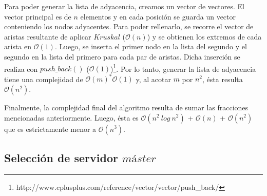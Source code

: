 \begin{itemize}
\begin{itemize}
  Para poder generar la lista de adyacencia, creamos un vector de vectores. El vector principal es de $n$ elementos y en cada posición se guarda un vector conteniendo los nodos adyacentes. Para poder rellenarlo, se recorre el vector de aristas resultante de aplicar $Kruskal$ ($\mathcal{O}(n)$) y se obtienen los extremos de cada arista en $\mathcal{O}(1)$. Luego, se inserta el primer nodo en la lista del segundo y el segundo en la lista del primero para cada par de aristas. Dicha inserción se realiza con $push\_back()$ ($\mathcal{O}(1)$)\footnote{http://www.cplusplus.com/reference/vector/vector/push_back/}. Por lo tanto, generar la lista de adyacencia tiene una complejidad de $\mathcal{O}(m)^*\mathcal{O}(1)$ y, al acotar $m$ por $n^{2}$, ésta resulta $\mathcal{O}(n^{2})$.
	
\end{itemize}

 Finalmente, la complejidad final del algoritmo resulta de sumar las fracciones mencionadas anteriormente. Luego, ésta es $\mathcal{O}(n^{2}\ log\ n^{2})$ + $\mathcal{O}(n)$ + $\mathcal{O}(n^{2})$ que es estrictamente menor a $\mathcal{O}(n^{3})$.

\subsection{Selección de servidor $máster$}


\end{itemize}
